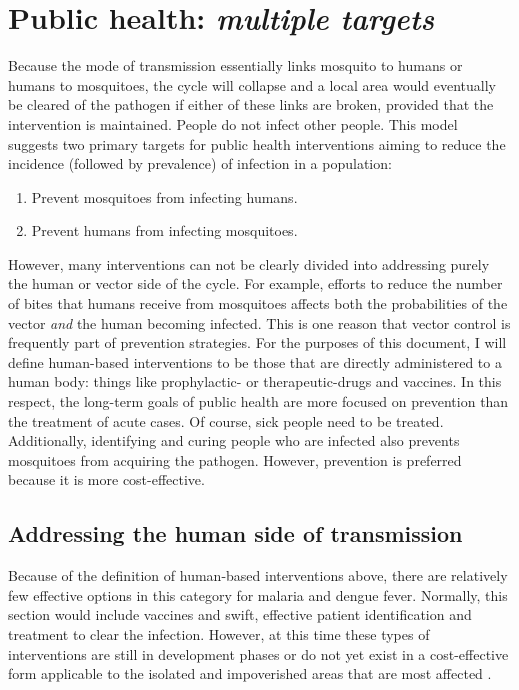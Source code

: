 \section{Public health: \emph{multiple targets}}

Because the mode of transmission essentially links mosquito to humans or humans to mosquitoes, the cycle will collapse and a local area would eventually be cleared of the pathogen if either of these links are broken, provided that the intervention is maintained.
People do not infect other people.
This model suggests two primary targets for public health interventions aiming to reduce the \gls{incidence}
(followed by \gls{prevalence}) of infection in a population:

\begin{enumerate}
\item Prevent mosquitoes from infecting humans.
\item Prevent humans from infecting mosquitoes.
\end{enumerate}

However, many interventions can not be clearly divided into addressing purely the human or vector side of the cycle.
For example, efforts to reduce the number of bites that humans receive from mosquitoes affects both the probabilities of the vector \emph{and} the human becoming infected.
This is one reason that vector control is frequently part of prevention strategies.
For the purposes of this document, I will define human-based interventions to be those that are directly administered to a human body: things like prophylactic- or therapeutic-drugs and vaccines.
In this respect, the long-term goals of public health are more focused on prevention than the treatment of acute cases.
Of course, sick people need to be treated. Additionally, identifying and curing people who are infected also prevents mosquitoes from acquiring the pathogen.
However, prevention is preferred because it is more cost-effective.


\subsection{Addressing the human side of transmission}

Because of the definition of human-based interventions above, there are relatively few effective options in this category for malaria and dengue fever.
Normally, this section would include vaccines and swift, effective patient identification and treatment to clear the infection.
However, at this time these types of interventions are still in development phases or do not yet exist in a cost-effective form applicable to the isolated and impoverished areas that are most affected \cite{Graves2006,DelAngel2013,Amin2005}.

